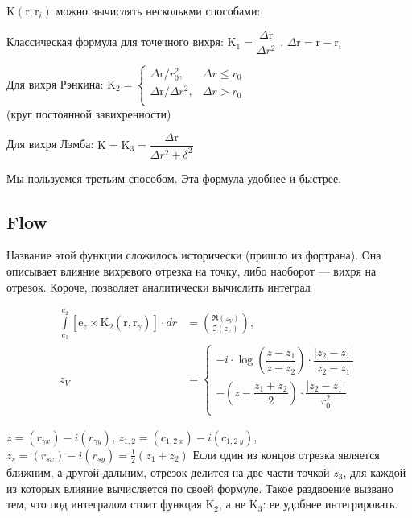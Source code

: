 \documentclass[14pt]{extreport}
\newcommand{\br}[1]{\boldsymbol{\mathrm{#1}}}
\renewcommand{\vec}[1]{\br{#1}}
\newenvironment{packed_enum}{
\begin{enumerate}
  \setlength{\itemsep}{1pt}
  \setlength{\parskip}{0pt}
  \setlength{\parsep}{0pt}
}{\end{enumerate}}
\begin{document}
$\br K (\br r, \br r_i)$ можно вычислять несколькми способами:
\begin{packed_enum}
\item Классическая формула для точечного вихря:
$\br K_1 = \dfrac {\Delta\br r}{\Delta r^2}$
, $\Delta \vec r = \vec r - \vec r_i$

\item Для вихря Рэнкина:
$\br K_2 = \begin{cases}
\Delta\br r / r_0^2,	&\Delta r \le r_0 \\
{\Delta\br r}/{\Delta r^2}, 	&\Delta r>r_0\\
\end{cases}$
\\ (круг постоянной завихренности)

\item Для вихря Лэмба:
$\br K = \br K_3 = \dfrac {\Delta\br r}{\Delta r^2 + \delta^2}$
\end{packed_enum}

Мы пользуемся третьим способом. Эта формула удобнее и быстрее.

\subsection{Flow}
\label{Flow}

Название этой функции сложилось исторически (пришло из фортрана). Она описывает влияние вихревого отрезка на точку, либо наоборот --- вихря на отрезок.
Короче, позволяет аналитически вычислить интеграл

\begin{equation}
\label{eq_Flow}
\begin{split}
\int\limits_{\vec c_1}^{\vec c_2} [\vec e_z \times \vec K_2(\vec r,\vec r_\gamma)] \cdot dr &= \binom{\Re(z_V)}{\Im(z_V)}, \\
z_V &= \begin{cases}
	-i \cdot \log \left(\dfrac{z-z_1}{z-z_2}\right) \cdot \dfrac{|z_2 - z_1|}{z_2 - z_1} \\
	- \left(z - \dfrac{z_1+z_2}{2} \right) \cdot \dfrac{|z_2 - z_1|}{r_0^2} \\
\end{cases}
\end{split}
\end{equation}

$z = (r_{\gamma x}) - i (r_{\gamma y})$, $z_{1,2} = (c_{1,2~x}) - i (c_{1,2~y})$, $z_s = (r_{sx}) - i (r_{sy}) = \frac{1}{2}(z_1 + z_2)$
Если один из концов отрезка является ближним, а другой дальним, 
отрезок делится на две части точкой $z_3$, для каждой
из которых влияние вычисляется по своей формуле.
Такое раздвоение вызвано тем, что под интегралом стоит
функция $\vec K_2$, а не $\vec K_3$: ее удобнее интегрировать.
\end{document}
